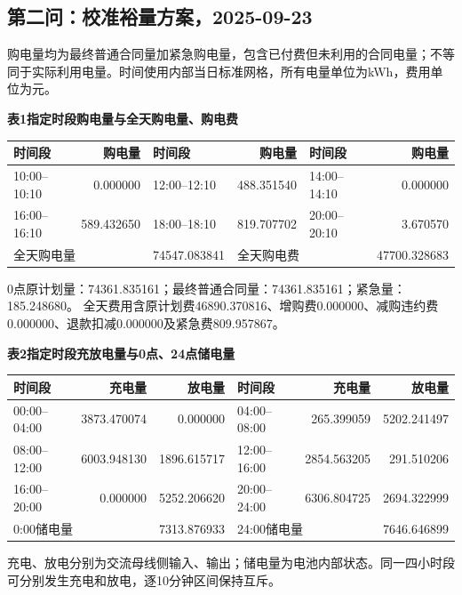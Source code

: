 \subsection{第二问：校准裕量方案，2025-09-23}
\begingroup\small
\setlength{\tabcolsep}{4pt}\renewcommand{\arraystretch}{1.08}
\setlength{\LTpre}{4pt}\setlength{\LTpost}{4pt}
\noindent 购电量均为最终普通合同量加紧急购电量，包含已付费但未利用的合同电量；不等同于实际利用电量。时间使用内部当日标准网格，所有电量单位为kWh，费用单位为元。
\begin{center}\textbf{表1\quad 指定时段购电量与全天购电量、购电费}\par\smallskip
\begin{tabular}{lr lr lr}\toprule
时间段 & 购电量 & 时间段 & 购电量 & 时间段 & 购电量\\\midrule
10:00--10:10 & 0.000000 & 12:00--12:10 & 488.351540 & 14:00--14:10 & 0.000000\\
16:00--16:10 & 589.432650 & 18:00--18:10 & 819.707702 & 20:00--20:10 & 3.670570\\
\midrule
\multicolumn{2}{l}{全天购电量} & 74547.083841 & \multicolumn{2}{l}{全天购电费} & 47700.328683\\
\bottomrule\end{tabular}\end{center}
\noindent 0点原计划量：74361.835161；最终普通合同量：74361.835161；紧急量：185.248680。
全天费用含原计划费46890.370816、增购费0.000000、减购违约费0.000000、退款扣减0.000000及紧急费809.957867。
\begin{center}\textbf{表2\quad 指定时段充放电量与0点、24点储电量}\par\smallskip
\begin{tabular}{lrr lrr}\toprule
时间段 & 充电量 & 放电量 & 时间段 & 充电量 & 放电量\\\midrule
00:00--04:00 & 3873.470074 & 0.000000 & 04:00--08:00 & 265.399059 & 5202.241497\\
08:00--12:00 & 6003.948130 & 1896.615717 & 12:00--16:00 & 2854.563205 & 291.510206\\
16:00--20:00 & 0.000000 & 5252.206620 & 20:00--24:00 & 6306.804725 & 2694.322999\\
\midrule
\multicolumn{2}{l}{0:00储电量} & 7313.876933 & \multicolumn{2}{l}{24:00储电量} & 7646.646899\\
\bottomrule\end{tabular}\end{center}
\noindent 充电、放电分别为交流母线侧输入、输出；储电量为电池内部状态。同一四小时段可分别发生充电和放电，逐10分钟区间保持互斥。
